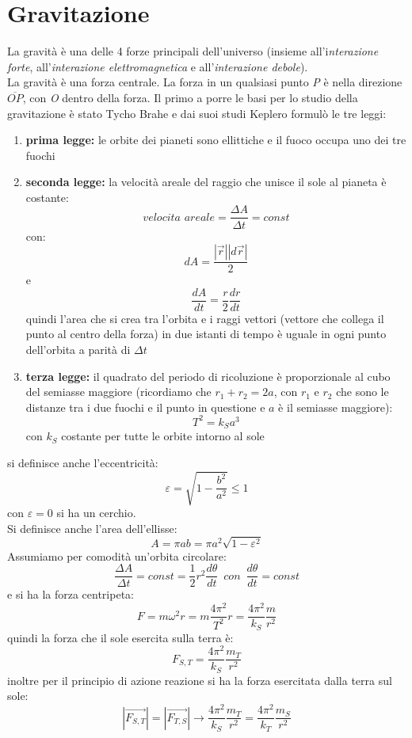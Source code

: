 \documentclass[a4paper,12pt, oneside]{book}
\begin{document}
\section{Gravitazione}
La gravità è una delle 4 forze principali dell'universo (insieme all'i\textit{nterazione forte}, all'\textit{interazione elettromagnetica} e all'\textit{interazione debole}). \\
La gravità è una forza centrale. La forza in un qualsiasi punto \textit{P} è nella direzione $\overline{OP}$, con \textit{O} dentro della forza. Il primo a porre le basi per lo studio della gravitazione è stato Tycho Brahe e dai suoi studi Keplero formulò le tre leggi:
\begin{enumerate}
	\item \textbf{prima legge:} le orbite dei pianeti sono ellittiche e il fuoco occupa uno dei tre fuochi
	\item \textbf{seconda legge:} la velocità areale del raggio che unisce il sole al pianeta è costante:
	      $$velocita\,\,areale=\frac{\Delta A}{\Delta t}=const$$
	      con:
	      $$dA=\frac{|\vec{r}||d\vec{r}|}{2}$$
	      e
	      $$\frac{dA}{dt}=\frac{r}{2}\frac{dr}{dt}$$
	      quindi l'area che si crea tra l'orbita e i raggi vettori (vettore che collega il punto al centro della forza) in due istanti di tempo è uguale in ogni punto dell'orbita a parità di $\Delta t$
	\item \textbf{terza legge:} il quadrato del periodo di ricoluzione è proporzionale al cubo del semiasse maggiore (ricordiamo che $r_1+r_2=2a$, con $r_1$ e $r_2$ che sono le distanze tra i due fuochi e il punto in questione e $a$ è il semiasse maggiore):
	      $$T^2=k_Sa^3$$
	      con $k_S$ costante per tutte le orbite intorno al sole
\end{enumerate}
si definisce anche l'eccentricità:
$$\varepsilon=\sqrt{1-\frac{b^2}{a^2}}\leq 1$$
con $\varepsilon=0$ si ha un cerchio.\\
Si definisce anche l'area dell'ellisse:
$$A=\pi ab=\pi a^2 \sqrt{1-\varepsilon^2}$$
Assumiamo per comodità un'orbita circolare:
$$\frac{\Delta A}{\Delta t}=const=\frac{1}{2}r^2\frac{d\theta}{dt}\,\,\, con\,\,\, \frac{d\theta}{dt}=const$$
e si ha la forza centripeta:
$$F=m\omega^2r=m\frac{4\pi^2}{T^2}r=\frac{4\pi^2}{k_S}\frac{m}{r^2}$$
quindi la forza che il sole esercita sulla terra è:
$$F_{S,T}=\frac{4\pi^2}{k_S}\frac{m_T}{r^2}$$
inoltre per il principio di azione reazione si ha la forza esercitata dalla terra sul sole:
$$|\vec{F_{S,T}}|=|\vec{F_{T,S}}|\to \frac{4\pi^2}{k_S}\frac{m_T}{r^2}=\frac{4\pi^2}{k_T}\frac{m_S}{r^2}$$
\end{document}
